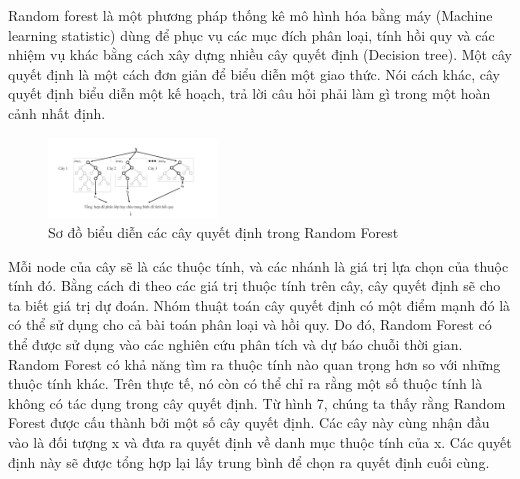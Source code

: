 Random forest là một phương pháp thống kê mô hình hóa bằng máy (Machine learning statistic) dùng để phục vụ các mục đích phân loại, tính hồi quy và các nhiệm vụ khác bằng cách xây dựng nhiều cây quyết định (Decision tree). Một cây quyết định là một cách đơn giản để biểu diễn một giao thức. Nói cách khác, cây quyết định biểu diễn một kế hoạch, trả lời câu hỏi phải làm gì trong một hoàn cảnh nhất định.

\begin{figure}[htbp]
\centerline{\includegraphics[width=0.4\textwidth]{img/RF.png}}
\caption{Sơ đồ biểu diễn các cây quyết định trong Random Forest}
\label{fig}
\end{figure}

Mỗi node của cây sẽ là các thuộc tính, và các nhánh là giá trị lựa chọn của thuộc tính đó. Bằng cách đi theo các giá trị thuộc tính trên cây, cây quyết định sẽ cho ta biết giá trị dự đoán. Nhóm thuật toán cây quyết định có một điểm mạnh đó là có thể sử dụng cho cả bài toán phân loại và hồi quy. Do đó, Random Forest có thể được sử dụng vào các nghiên cứu phân tích và dự báo chuỗi thời gian. Random Forest có khả năng tìm ra thuộc tính nào quan trọng hơn so với những thuộc tính khác. Trên thực tế, nó còn có thể chỉ ra rằng một số thuộc tính là không có tác dụng trong cây quyết định. Từ hình 7, chúng ta thấy rằng Random Forest được cấu thành bởi một số cây quyết định. Các cây này cùng nhận đầu vào là đối tượng x và đưa ra quyết định về danh mục thuộc tính của x. Các quyết định này sẽ được tổng hợp lại lấy trung bình để chọn ra quyết định cuối cùng.



